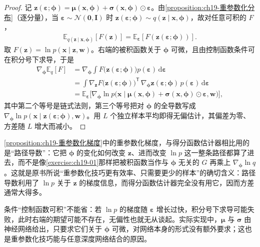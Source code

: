 \documentclass[../../main.tex]{subfiles}
\begin{document}
\begin{proof}
记 $\bm{z}(\bm{\varepsilon};\bm{\phi})=\bm{\mu}(\bm{x},\bm{\phi})+\bm{\sigma}(\bm{x},\bm{\phi})\odot\bm{\varepsilon}$。由\cref{proposition:ch19-重参数化分布}（逐分量），当 $\bm{\varepsilon}\sim\mathcal{N}(\bm{0},\bm{I})$ 时 $\bm{z}(\bm{\varepsilon};\bm{\phi})\sim q(\bm{z}\mid\bm{x},\bm{\phi})$，故对任意可积的 $F$，
\begin{align*}
\mathbb{E}_{q(\bm{z}\mid\bm{x},\bm{\phi})}[F(\bm{z})]=\mathbb{E}_{\bm{\varepsilon}}[F(\bm{z}(\bm{\varepsilon};\bm{\phi}))].
\end{align*}
取 $F(\bm{z})=\ln p(\bm{x}\mid\bm{z},\bm{w})$。右端的被积函数关于 $\bm{\phi}$ 可微，且由控制函数条件可在积分号下求导，于是
\begin{align*}
\nabla_{\bm{\phi}}\mathbb{E}_{q}[F]&=\nabla_{\bm{\phi}}\int F\big(\bm{z}(\bm{\varepsilon};\bm{\phi})\big)p(\bm{\varepsilon})\,\mathrm{d}\bm{\varepsilon}\\
&=\int\nabla_{\bm{z}}F\big(\bm{z}(\bm{\varepsilon};\bm{\phi})\big)^{\mathsf T}\,\nabla_{\bm{\phi}}\bm{z}(\bm{\varepsilon};\bm{\phi})\,p(\bm{\varepsilon})\,\mathrm{d}\bm{\varepsilon}\\
&=\mathbb{E}_{\bm{\varepsilon}}\Big[\nabla_{\bm{\phi}}\ln p\big(\bm{x}\mid\bm{\mu}(\bm{x},\bm{\phi})+\bm{\sigma}(\bm{x},\bm{\phi})\odot\bm{\varepsilon},\bm{w}\big)\Big],
\end{align*}
其中第二个等号是链式法则，第三个等号把对 $\bm{\phi}$ 的全导数写成 $\nabla_{\bm{\phi}}\ln p(\bm{x}\mid\bm{z}(\bm{\varepsilon};\bm{\phi}),\bm{w})$。用 $L$ 个独立样本平均即得无偏估计，其偏差为零、方差随 $L$ 增大而减小。
\end{proof}

\begin{remark}
\cref{proposition:ch19-重参数化梯度}中的重参数化梯度，与得分函数估计器相比用的是“路径导数”：它把 $\bm{\phi}$ 的变化如何改变 $\bm{z}$、进而改变 $\ln p$ 这一整条路径都算了进去，而不是像\cref{exercise:ch19-01}那样把被积函数当作与 $\bm{\phi}$ 无关的 $G$ 再乘上 $\nabla_{\bm{\phi}}\ln q$。这就是原书所说“重参数化技巧更有效率、只需要更少的样本”的确切含义：路径导数利用了 $\ln p$ 关于 $\bm{z}$ 的梯度信息，而得分函数估计器完全没有用它，因而方差通常大得多。

条件“控制函数可积”不能省：若 $\ln p$ 的梯度随 $\bm{\varepsilon}$ 增长过快，积分号下求导可能失败，此时右端的期望可能不存在，无偏性也就无从谈起。实际实现中，$\bm{\mu}$ 与 $\bm{\sigma}$ 由神经网络给出，只要求它们关于 $\bm{\phi}$ 可微，对网络本身的形式没有额外要求；这也是重参数化技巧能与任意深度网络结合的原因。
\end{remark}
\end{document}
